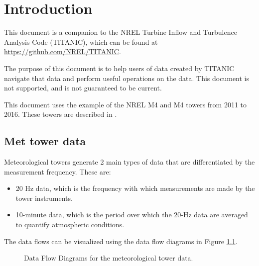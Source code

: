 \chapter{Introduction}
This document is a companion to the NREL Turbine Inflow and Turbulence Analysis Code (TITANIC), which can be found at \href{https://github.com/NREL/TITANIC}{https://github.com/NREL/TITANIC}.

The purpose of this document is to help users of data created by TITANIC navigate that data and perform useful operations on the data. This document is not supported, and is not guaranteed to be current.

This document uses the example of the NREL M4 and M4 towers from 2011 to 2016. These towers are described in \cite{Clifton_2013_c}.

\section{Met tower data}
Meteorological towers generate 2 main types of data that are differentiated by the measurement frequency. These are:
\begin{itemize}
\item 20 Hz data, which is the frequency with which measurements are made by the tower instruments.
\item 10-minute data, which is the period over which the 20-Hz data are averaged to quantify atmospheric conditions.
\end{itemize}

The data flows can be visualized using the data flow diagrams in Figure \ref{fig:NWTCDFD}.

\begin{figure}
\centering
\caption[Data Flow Diagrams for the meteorological tower data]{Data Flow Diagrams for the meteorological tower data. \label{fig:NWTCDFD}}
\end{figure}



